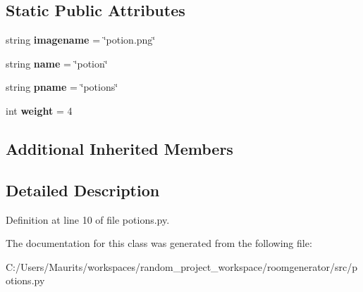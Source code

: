 \subsection*{Static Public Attributes}
\begin{DoxyCompactItemize}
\item 
\hypertarget{classpotions_1_1_potion_a33a3addd9dd1f43226982d4456aa3f0d}{}string {\bfseries imagename} = \char`\"{}potion.\+png\char`\"{}\label{classpotions_1_1_potion_a33a3addd9dd1f43226982d4456aa3f0d}

\item 
\hypertarget{classpotions_1_1_potion_ac90cc8b27fb5b4c220da0749ef051a6c}{}string {\bfseries name} = \char`\"{}potion\char`\"{}\label{classpotions_1_1_potion_ac90cc8b27fb5b4c220da0749ef051a6c}

\item 
\hypertarget{classpotions_1_1_potion_a36897c4528c8cdeec943fed4af836d30}{}string {\bfseries pname} = \char`\"{}potions\char`\"{}\label{classpotions_1_1_potion_a36897c4528c8cdeec943fed4af836d30}

\item 
\hypertarget{classpotions_1_1_potion_a929424d8dbed4f74cc7aa48bd27d9649}{}int {\bfseries weight} = 4\label{classpotions_1_1_potion_a929424d8dbed4f74cc7aa48bd27d9649}

\end{DoxyCompactItemize}
\subsection*{Additional Inherited Members}


\subsection{Detailed Description}


Definition at line 10 of file potions.\+py.



The documentation for this class was generated from the following file\+:\begin{DoxyCompactItemize}
\item 
C\+:/\+Users/\+Maurits/workspaces/random\+\_\+project\+\_\+workspace/roomgenerator/src/potions.\+py\end{DoxyCompactItemize}
